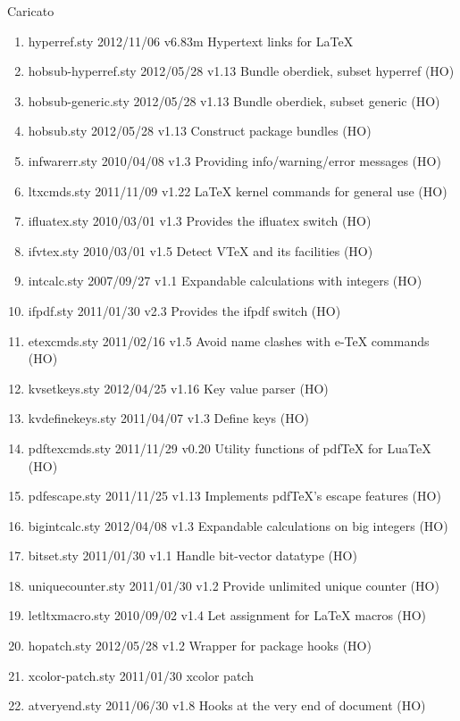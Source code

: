 Caricato 
\begin{enumerate}
\item 	hyperref.sty    2012/11/06 v6.83m Hypertext links for LaTeX
\item 	hobsub-hyperref.sty    2012/05/28 v1.13 Bundle oberdiek, subset hyperref (HO)
\item 	hobsub-generic.sty    2012/05/28 v1.13 Bundle oberdiek, subset generic (HO)
\item 	hobsub.sty    2012/05/28 v1.13 Construct package bundles (HO)
\item 	infwarerr.sty    2010/04/08 v1.3 Providing info/warning/error messages (HO)
\item 	ltxcmds.sty    2011/11/09 v1.22 LaTeX kernel commands for general use (HO)
\item 	ifluatex.sty    2010/03/01 v1.3 Provides the ifluatex switch (HO)
\item 	ifvtex.sty    2010/03/01 v1.5 Detect VTeX and its facilities (HO)
\item 	intcalc.sty    2007/09/27 v1.1 Expandable calculations with integers (HO)
\item 	ifpdf.sty    2011/01/30 v2.3 Provides the ifpdf switch (HO)
\item 	etexcmds.sty    2011/02/16 v1.5 Avoid name clashes with e-TeX commands (HO)
\item 	kvsetkeys.sty    2012/04/25 v1.16 Key value parser (HO)
\item 	kvdefinekeys.sty    2011/04/07 v1.3 Define keys (HO)
\item 	pdftexcmds.sty    2011/11/29 v0.20 Utility functions of pdfTeX for LuaTeX (HO)
\item 	pdfescape.sty    2011/11/25 v1.13 Implements pdfTeX's escape features (HO)
\item 	bigintcalc.sty    2012/04/08 v1.3 Expandable calculations on big integers (HO)
\item 	bitset.sty    2011/01/30 v1.1 Handle bit-vector datatype (HO)
\item 	uniquecounter.sty    2011/01/30 v1.2 Provide unlimited unique counter (HO)
\item 	letltxmacro.sty    2010/09/02 v1.4 Let assignment for LaTeX macros (HO)
\item 	hopatch.sty    2012/05/28 v1.2 Wrapper for package hooks (HO)
\item 	xcolor-patch.sty    2011/01/30 xcolor patch
\item 	atveryend.sty    2011/06/30 v1.8 Hooks at the very end of document (HO)

\end{enumerate}
